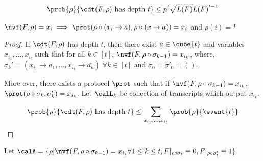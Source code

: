 \newcommand{\nvfconds}{
    \{\rho| \nvf(F,\rho \circ \sigma_{k-1}) = x_{i_k} \forall 1 \leq k \leq t, F|_{\rho\circ \sigma_t} \equiv 0, F|_{\rho \circ \sigma_t'} \equiv 1  \}
}

\newcommand{\nvfcondsk}[1]{
\{\rho| \nvf(F,\rho \circ \sigma_{j-1}) = x_{i_j} \forall 1 \leq j \leq #1\}
}



\begin{lemma} 
    $$\prob{\rho}{\cdt(F,\rho) \mathrm{\ has\ depth\ } t} \leq p^t \sqrt{L(F)} {L(F)}^{t-1}$$ 
\end{lemma}


\begin{claim}
    $\nvf(F,\rho) = x_i \implies \prot(\rho\circ (x_i \to a), \rho\circ(x \to \bar{a})) = x_i$ and $\rho(i) = *$
\end{claim}


\begin{proof}
If $\cdt(F,\rho)$ has depth $t$, then there exist $a \in \cube{t}$ and variables $x_{i_1}, \ldots , x_{i_t}$ such that for all $k \in [t]$, $\nvf(F, \rho \circ \sigma_{k-1} )= x_{i_k}$,  
    where, $\sigma_k' = (x_{i_1}\to a_1,\ldots, x_{i_k} \to \bar{a_k})$ $\forall k \in [t]$ and $\sigma_0 = \sigma'_0 = ()$.

    More over, there exists a protocol $\prot$ such that if $\nvf(F, \rho\circ \sigma_{k-1}) = x_{i_k}$,  
    $\prot(\rho\circ \sigma_k, \sigma_k') = x_{i_k}$. Let $\calL_k$ be collection of transcripts which output $x_{i_k}$.   
    
    \begin{align*}
        \prob{\rho}{\cdt(F,\rho) \mathrm{\ has\ depth\ } t}   
        &\leq \sum_{x_{i_1}, \dots , x_{i_t}}  
        \prob{\rho}{\event{t}}    \\
    \end{align*}
    

\end{proof}


Let $\calA = \nvfconds$

     
